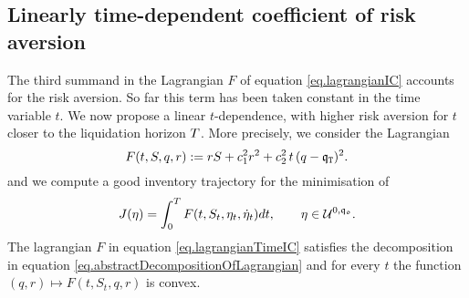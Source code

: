 \documentclass[10pt,a4paper]{article}
\begin{document}
\subsection{Linearly time-dependent coefficient of risk aversion}\label{sec.timeIC}
The third summand in the Lagrangian $F$ of equation \eqref{eq.lagrangianIC} accounts for the risk aversion. So far this term has been taken constant in the time variable $t$. We now propose a linear $t$-dependence, with higher risk aversion for $t$ closer to the liquidation horizon $T$. More precisely, we consider the Lagrangian
\begin{equation}\label{eq.lagrangianTimeIC}
F(t,S,q,r):= rS + c_{1}^{2} r^{2} +c_{2}^{2} \, t \,  (q-\mathfrak{q}_{\mathtt{T} })^{2}.
\end{equation}
and we compute a good inventory trajectory for the minimisation of 
\begin{equation*}\label{eq.costFunctionalTimeIC}
J(\eta)=\int_{0}^{T} F (t,S_t,\eta_t,\dot{\eta}_t) dt, \qquad \eta \in \mathcal{U}^{0,\mathfrak{q_0}}.
\end{equation*}
The lagrangian $F$ in equation \eqref{eq.lagrangianTimeIC} satisfies the decomposition in equation \eqref{eq.abstractDecompositionOfLagrangian} and for every $t$ the function $(q,r)\mapsto F(t,S_t,q,r)$ is convex. 
\end{document}
